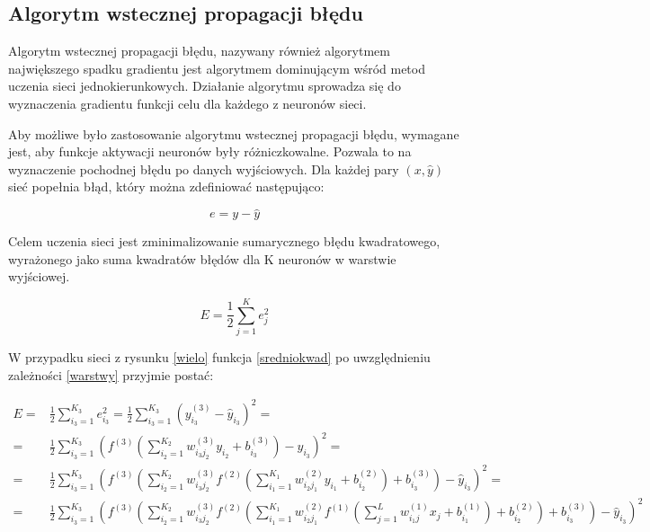 \documentclass[12pt,twoside]{article}
\begin{document}
\subsection{Algorytm wstecznej propagacji błędu}

Algorytm wstecznej propagacji błędu, nazywany również algorytmem największego spadku gradientu jest algorytmem dominującym wśród metod uczenia sieci jednokierunkowych. Działanie algorytmu sprowadza się do wyznaczenia gradientu funkcji celu dla każdego z neuronów sieci. 

Aby możliwe było zastosowanie algorytmu wstecznej propagacji błędu, wymagane jest, aby funkcje aktywacji neuronów były różniczkowalne. Pozwala to na wyznaczenie pochodnej błędu po danych wyjściowych. Dla każdej pary $(x, \hat{y})$ sieć popełnia błąd, który można zdefiniować następująco:

\begin{equation}
e = y - \hat{y}
\end{equation}

Celem uczenia sieci jest zminimalizowanie sumarycznego błędu kwadratowego, wyrażonego jako suma kwadratów błędów dla K neuronów w warstwie wyjściowej.

\begin{equation}\label{sredniokwad}
E = \frac{1}{2} \sum_{j=1}^{K} e_{j}^2
\end{equation}

W przypadku sieci z rysunku \ref{wielo} funkcja \ref{sredniokwad} po uwzględnieniu zależności \ref{warstwy} przyjmie postać:

\begin{equation}
\begin{aligned}
E =& \frac{1}{2} \sum_{i_{3}=1}^{K_{3}} e_{i_{3}}^2 = \frac{1}{2} \sum_{i_{3}=1}^{K_{3}}\left( y_{i_{3}}^{(3)} - \hat{y}_{i_{3}} \right)^2 =\\
 =& \frac{1}{2} \sum_{i_{3}=1}^{K_{3}} \left( f^{(3)}\left( \sum_{i_{2}=1}^{K_{2}} w_{i_{3}j_{2}}^{(3)}y_{i_{2}} + b_{i_{3}}^{(3)} \right) - \hat{y}_{i_{3}} \right)^2 =\\
=& \frac{1}{2} \sum_{i_{3}=1}^{K_{3}} \left( f^{(3)}\left( \sum_{i_{2}=1}^{K_{2}} w_{i_{3}j_{2}}^{(3)} f^{(2)}\left( \sum_{i_{1}=1}^{K_{1}} w_{i_{2}j_{1}}^{(2)} y_{i_{1}} + b_{i_{2}}^{(2)} \right) + b_{i_{3}}^{(3)} \right) - \hat{y}_{i_{3}} \right)^2 =\\
=& \frac{1}{2} \sum_{i_{3}=1}^{K_{3}} \left( f^{(3)}\left( \sum_{i_{2}=1}^{K_{2}} w_{i_{3}j_{2}}^{(3)} f^{(2)}\left( \sum_{i_{1}=1}^{K_{1}} w_{i_{2}j_{1}}^{(2)} f^{(1)}\left( \sum_{j=1}^{L} w_{i_{1}j}^{(1)} x_{j} + b_{i_{1}}^{(1)} \right) + b_{i_{2}}^{(2)} \right) + b_{i_{3}}^{(3)} \right) - \hat{y}_{i_{3}} \right)^2 
\end{aligned}
\end{equation}\\
\end{document}
